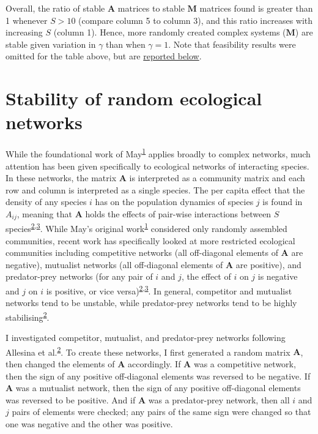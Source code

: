 \documentclass[]{article}
\begin{document}
Overall, the ratio of stable \(\mathbf{A}\) matrices to stable
\(\mathbf{M}\) matrices found is greater than 1 whenever \(S > 10\)
(compare column 5 to column 3), and this ratio increases with increasing
\(S\) (column 1). Hence, more randomly created complex systems
(\(\mathbf{M}\)) are stable given variation in \(\gamma\) than when
\(\gamma = 1\). Note that feasibility results were omitted for the table
above, but are \protect\hyperlink{Feasibility}{reported below}.

\hypertarget{ecological}{\section{Stability of random ecological
networks}\label{ecological}}

While the foundational work of
May\textsuperscript{\protect\hyperlink{ref-May1972}{1}} applies broadly
to complex networks, much attention has been given specifically to
ecological networks of interacting species. In these networks, the
matrix \(\mathbf{A}\) is interpreted as a community matrix and each row
and column is interpreted as a single species. The per capita effect
that the density of any species \(i\) has on the population dynamics of
species \(j\) is found in \(A_{ij}\), meaning that \(\mathbf{A}\) holds
the effects of pair-wise interactions between \(S\)
species\textsuperscript{\protect\hyperlink{ref-Allesina2012}{2},\protect\hyperlink{ref-Allesina2015}{3}}.
While May's original
work\textsuperscript{\protect\hyperlink{ref-May1972}{1}} considered only
randomly assembled communities, recent work has specifically looked at
more restricted ecological communities including competitive networks
(all off-diagonal elements of \(\mathbf{A}\) are negative), mutualist
networks (all off-diagonal elements of \(\mathbf{A}\) are positive), and
predator-prey networks (for any pair of \(i\) and \(j\), the effect of
\(i\) on \(j\) is negative and \(j\) on \(i\) is positive, or vice
versa)\textsuperscript{\protect\hyperlink{ref-Allesina2012}{2},\protect\hyperlink{ref-Allesina2015}{3}}.
In general, competitor and mutualist networks tend to be unstable, while
predator-prey networks tend to be highly
stabilising\textsuperscript{\protect\hyperlink{ref-Allesina2012}{2}}.

I investigated competitor, mutualist, and predator-prey networks
following Allesina et
al.\textsuperscript{\protect\hyperlink{ref-Allesina2012}{2}}. To create
these networks, I first generated a random matrix \(\mathbf{A}\), then
changed the elements of \(\mathbf{A}\) accordingly. If \(\mathbf{A}\)
was a competitive network, then the sign of any positive off-diagonal
elements was reversed to be negative. If \(\mathbf{A}\) was a mutualist
network, then the sign of any positive off-diagonal elements was
reversed to be positive. And if \(\mathbf{A}\) was a predator-prey
network, then all \(i\) and \(j\) pairs of elements were checked; any
pairs of the same sign were changed so that one was negative and the
other was positive.
\end{document}
